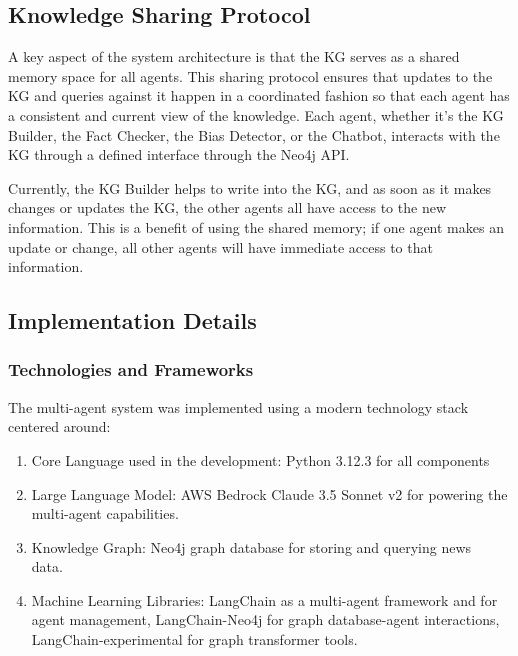 \documentclass[11pt]{article}
\begin{document}
\subsection{Knowledge Sharing Protocol}
A key aspect of the system architecture is that the KG serves as a shared memory space for all agents. This sharing protocol ensures that updates to the KG and queries against it happen in a coordinated fashion so that each agent has a consistent and current view of the knowledge. Each agent, whether it’s the KG Builder, the Fact Checker, the Bias Detector, or the Chatbot, interacts with the KG through a defined interface through the Neo4j API.

Currently, the KG Builder helps to write into the KG, and as soon as it makes changes or updates the KG, the other agents all have access to the new information. This is a benefit of using the shared memory; if one agent makes an update or change, all other agents will have immediate access to that information.

\subsection{Implementation Details}
\subsubsection{Technologies and Frameworks}
The multi-agent system was implemented using a modern technology stack centered around:
\begin{enumerate}
    \item Core Language used in the development: Python 3.12.3 for all components
    \item Large Language Model: AWS Bedrock Claude 3.5 Sonnet v2 for powering the multi-agent capabilities.
\item Knowledge Graph: Neo4j graph database for storing and querying news data.  
\item Machine Learning Libraries: LangChain as a multi-agent framework and for agent management, LangChain-Neo4j for graph database-agent interactions, LangChain-experimental for graph transformer tools.
\end{enumerate}
\end{document}
